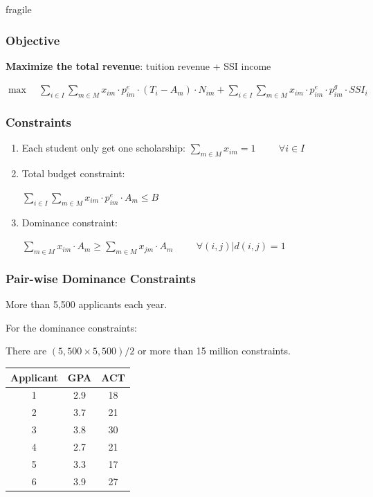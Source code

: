 \documentclass{beamer}
\begin{document}
\begin{frame}{fragile}
\frametitle{Objective}
\textbf{Maximize the total revenue}: tuition revenue + SSI 
income

\scriptsize{
 $\max \quad \sum_{i\in I} \sum_{m\in M} x_{im}\cdot p^e_{im}\cdot(T_i-A_m)\cdot N_{im}+
\sum_{i\in I} \sum_{m\in M} x_{im}\cdot p^e_{im} \cdot p^g_{im}\cdot SSI_i$

}


\end{frame}


\begin{frame}
\frametitle{Constraints}
\begin{enumerate}
\item Each student only get one scholarship: $\sum_{m \in 
M}x_{im}=1  \hspace{1cm} \forall i\in I $
\vfill
\item Total budget constraint: 

$\sum_{i \in I} \sum_{m\in M} 
x_{im}\cdot p^e_{im}\cdot A_m\leq B $
\vfill
\item Dominance constraint:

$ \sum_{m \in M} x_{im}\cdot A_m \geq \sum_{m \in M} 
x_{jm}\cdot A_m \hspace{1cm}  \forall
(i,j)|d(i,j)=1 $

\end{enumerate}
\end{frame}



\begin{frame}
\frametitle{Pair-wise Dominance Constraints}
More than 5,500 applicants each year.

For the dominance constraints:

There are $(5,500 \times 5,500) / 2$ or 
more than 15 million constraints.

\begin{table}[H]
\centering
\begin{tabular}{|c|c|c|}
\hline
  Applicant & GPA & ACT \\ [0.5ex] 
\hline
1 & 2.9 & 18 \\ \hline
2 & 3.7 & 21 \\ \hline
3 & 3.8 & 30 \\ \hline
4 & 2.7 & 21 \\ \hline
5 & 3.3 & 17 \\ \hline
6 & 3.9 & 27 \\ \hline
\end{tabular}
\end{table}

\end{frame}
\end{document}
